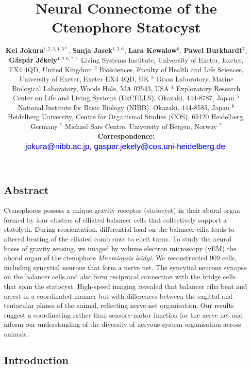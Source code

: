 \documentclass[
  11pt,
]{article}
\title{Neural Connectome of the Ctenophore Statocyst}
\subtitle{\textbf{Kei Jokura}\(^{1,2,3,4,5*}\), \textbf{Sanja
Jasek}\(^{1,2,6}\), \textbf{Lara Kewalow}\(^{6}\), \textbf{Pawel
Burkhardt}\(^{7}\), \textbf{Gáspár Jékely}\(^{1,2,6,*}\) \(^{1}\) Living
Systems Institute, University of Exeter, Exeter, EX4 4QD, United Kingdom
\(^{2}\) Biosciences, Faculty of Health and Life Sciences, University of
Exeter, Exeter EX4 4QD, UK \(^{3}\) Grass Laboratory, Marine Biological
Laboratory, Woods Hole, MA 02543, USA \(^{4}\) Exploratory Research
Center on Life and Living Systems (ExCELLS), Okazaki, 444-8787, Japan
\(^{5}\) National Institute for Basic Biology (NIBB), Okazaki, 444-8585,
Japan \(^{6}\) Heidelberg University, Centre for Organismal Studies
(COS), 69120 Heidelberg, Germany \(^{7}\) Michael Sars Centre,
University of Bergen, Norway \textbf{\(^{*}\) Correspondence:}
\includegraphics[width=30em,height=\textheight,keepaspectratio]{pictures/emails.png}}
\author{}
\date{}
\begin{document}
\maketitle

\linenumbers


\subsection{Abstract}\label{abstract}

Ctenophores possess a unique gravity receptor (statocyst) in their
aboral organ formed by four clusters of ciliated balancer cells that
collectively support a statolyth. During reorientation, differential
load on the balancer cilia leads to altered beating of the ciliated comb
rows to elicit turns. To study the neural bases of gravity sensing, we
imaged by volume electron microscopy (vEM) the aboral organ of the
ctenophore \emph{Mnemiopsis leidyi}. We reconstructed 909 cells,
including syncytial neurons that form a nerve net. The syncytial neurons
synapse on the balancer cells and also form reciprocal connection with
the bridge cells that span the statocyst. High-speed imaging revealed
that balancer cilia beat and arrest in a coordinated manner but with
differences between the sagittal and tentacular planes of the animal,
reflecting nerve-net organisation. Our results suggest a coordinating
rather than sensory-motor function for the nerve net and inform our
understanding of the diversity of nervous-system organisation across
animals.

\subsection{Introduction}\label{introduction}
\end{document}
